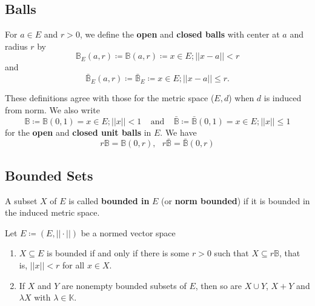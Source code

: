 \subsection*{Balls}

For \(a \in E\) and \(r > 0\), we define the \textbf{open} and \textbf{closed balls} with
center at \(a\) and radius \(r\) by 
\[
   \mathbb{B}_E (a, r) \coloneqq \mathbb{B} (a, r) \coloneqq {x \in E; || x - a || < r}  
\]
and 
\[
  \bar{\mathbb{B}}_E (a, r) \coloneqq \bar{\mathbb{B}}_E \coloneqq {x\in E ; || x - a|| \leq r}.  
\]

These definitions agree with those for the metric space (\(E, d\)) when \(d\) is induced
from norm. We also write
\[
  \mathbb{B} \coloneqq \mathbb{B}(0, 1) = {x\in E; ||x|| < 1} \:\:\:\:\: \text{and}
  \:\:\:\:\: \bar{\mathbb{B}} \coloneqq \bar{\mathbb{B}}(0, 1) = {x \in E; ||x|| \leq 1}  
\]
for the \textbf{open} and \textbf{closed unit balls} in \(E\). We have
\[
    r\mathbb{B} = \mathbb{B}(0, r), \:\:\: r\bar{\mathbb{B}} = \bar{\mathbb{B}}(0, r)  
\]

\subsection*{Bounded Sets}

A subset \(X\) of \(E\) is called \textbf{bounded in} \(E\) (or \textbf{norm bounded}) if 
it is bounded in the induced metric space.

\begin{remark}
    Let \(E \coloneqq \left(E, ||\cdot||\right)\) be a normed vector space 
    \begin{enumerate}[label=(\alph*)]
        \item \(X \subseteq E\) is bounded if and only if there is some \(r > 0\) such
        that \(X \subseteq r\mathbb{B}\), that is, \(||x|| < r\) for all \(x\in X\). 
        \item If \(X\) and \(Y\) are nonempty bounded subsets of \(E\), then so are
        \(X \cup Y \), \(X + Y\) and \(\lambda X\) with \(\lambda \in \mathbb{K}\). 
    \end{enumerate}
\end{remark}

